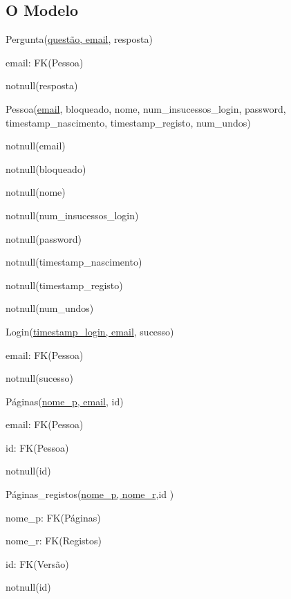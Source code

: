 \documentclass[11pt,a4paper]{article}
\begin{document}
\subsection{O Modelo}

\begin{description}[noitemsep]
	\item Pergunta(\underline{quest\~ao, email}, resposta)
	\item email: FK(Pessoa)
	\item notnull(resposta)
\end{description}

\begin{description}[noitemsep]
	\item Pessoa(\underline{email}, bloqueado, nome, num\_insucessos\_login, password, timestamp\_nascimento, timestamp\_registo, num\_undos)
	\item notnull(email)
	\item notnull(bloqueado)
	\item notnull(nome)
	\item notnull(num\_insucessos\_login)
	\item notnull(password)
	\item notnull(timestamp\_nascimento)
	\item notnull(timestamp\_registo)
	\item notnull(num\_undos)
\end{description}

\begin{description}[noitemsep]
	\item Login(\underline{timestamp\_login, email}, sucesso)
	\item email: FK(Pessoa)
	\item notnull(sucesso)
\end{description}

\begin{description}[noitemsep]
	\item P\'{a}ginas(\underline{nome\_p, email}, id)
	\item email: FK(Pessoa)
	\item id: FK(Pessoa)
	\item notnull(id)
\end{description}

\begin{description}[noitemsep]
	\item P\'{a}ginas\_registos(\underline{nome\_p, nome\_r},id )
	\item nome\_p: FK(P\'{a}ginas)
	\item nome\_r: FK(Registos)
	\item id: FK(Vers\~{a}o)
	\item notnull(id)
\end{description}
\end{document}
